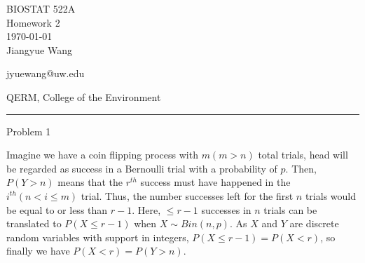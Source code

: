 \documentclass[12pt,letterpaper, onecolumn]{exam}
\begin{document}
\begingroup  
    \centering
    \LARGE BIOSTAT 522A\\
    \LARGE Homework 2\\[0.5em]
    \large \today\\[0.5em]
    \large Jiangyue Wang\par
    \large jyuewang@uw.edu\par
    \large QERM, College of the Environment\par
\endgroup
\rule{\textwidth}{0.4pt}
\pointsdroppedatright   %
\printanswers
\renewcommand{\solutiontitle}{\noindent\textbf{Ans:}\enspace}   %
\begin{questions}
    \question Problem 1
    \begin{solution}
    Imagine we have a coin flipping process with $m(m>n)$ total trials, head will be regarded as success in a Bernoulli trial with a probability of $p$. Then, $P(Y>n)$ means that the $r^{th}$ success must have happened in the $i^{th} (n<i \leq m)$ trial. Thus, the number successes left for the first $n$ trials would be equal to or less than $r-1$. Here, $\leq r-1$ successes in $n$ trials can be translated to $P(X \leq r-1)$ when $X \sim Bin(n,p)$. As $X$ and $Y$ are discrete random variables with support in integers, $P(X \leq r-1) = P(X < r)$, so finally we have $P(X<r) = P(Y>n)$.
    \end{solution}


\end{questions}
\end{document}
